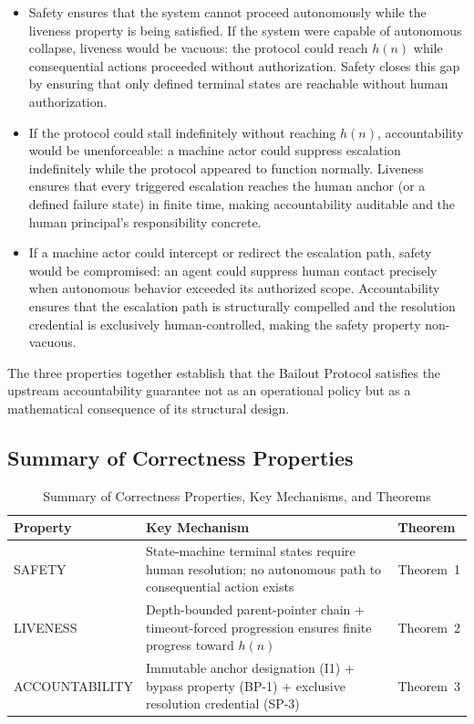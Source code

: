\begin{itemize}\itemsep=0pt
\item[\textbf{SAFETY $\Rightarrow$ LIVENESS}.] Safety ensures that the system cannot proceed autonomously while the liveness property is being satisfied. If the system were capable of autonomous collapse, liveness would be vacuous: the protocol could reach $h(n)$ while consequential actions proceeded without authorization. Safety closes this gap by ensuring that only defined terminal states are reachable without human authorization.

\item[\textbf{LIVENESS $\Rightarrow$ ACCOUNTABILITY}.] If the protocol could stall indefinitely without reaching $h(n)$, accountability would be unenforceable: a machine actor could suppress escalation indefinitely while the protocol appeared to function normally. Liveness ensures that every triggered escalation reaches the human anchor (or a defined failure state) in finite time, making accountability auditable and the human principal's responsibility concrete.

\item[\textbf{ACCOUNTABILITY $\Rightarrow$ SAFETY}.] If a machine actor could intercept or redirect the escalation path, safety would be compromised: an agent could suppress human contact precisely when autonomous behavior exceeded its authorized scope. Accountability ensures that the escalation path is structurally compelled and the resolution credential is exclusively human-controlled, making the safety property non-vacuous.
\end{itemize}

The three properties together establish that the Bailout Protocol satisfies the upstream accountability guarantee not as an operational policy but as a mathematical consequence of its structural design.

\subsection{Summary of Correctness Properties}
\label{sec:proof-summary}

\begin{table}[t]
\caption{Summary of Correctness Properties, Key Mechanisms, and Theorems}
\label{tab:proof-summary}
\medskip
\noindent\begin{tabular}{lp{5cm}p{4.5cm}}
\toprule
\textbf{Property} & \textbf{Key Mechanism} & \textbf{Theorem} \\
\midrule
SAFETY & State-machine terminal states require human resolution; no autonomous path to consequential action exists & Theorem~1 \\
LIVENESS & Depth-bounded parent-pointer chain + timeout-forced progression ensures finite progress toward $h(n)$ & Theorem~2 \\
ACCOUNTABILITY & Immutable anchor designation (I1) + bypass property (BP-1) + exclusive resolution credential (SP-3) & Theorem~3 \\
\bottomrule
\end{tabular}
\end{table}